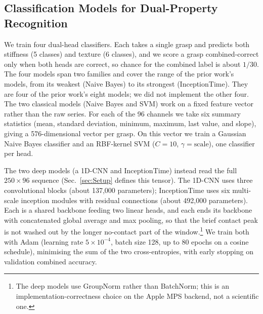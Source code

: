 \documentclass[journal]{IEEEtran}
\begin{document}
\subsection{Classification Models for Dual-Property Recognition}
\label{Methodology:Classification_Models}
%
%
%
We train four dual-head classifiers. Each takes a single grasp and predicts both stiffness (5 classes) and texture (6 classes), and we score a grasp combined-correct only when both heads are correct, so chance for the combined label is about $1/30$. The four models span two families and cover the range of the prior work's models, from its weakest (Naive Bayes) to its strongest (InceptionTime). They are four of the prior work's eight models; we did not implement the other four.
%
The two classical models (Naive Bayes and SVM) work on a fixed feature vector rather than the raw series. For each of the 96 channels we take six summary statistics (mean, standard deviation, minimum, maximum, last value, and slope), giving a 576-dimensional vector per grasp. On this vector we train a Gaussian Naive Bayes classifier and an RBF-kernel SVM ($C=10$, $\gamma=\mathrm{scale}$), one classifier per head.
%
%
%
%
%
% 
%
%

The two deep models (a 1D-CNN and InceptionTime) instead read the full $250 \times 96$ sequence (Sec.~\ref{sec:Setup} defines this tensor). The 1D-CNN uses three convolutional blocks (about 137{,}000 parameters); InceptionTime uses six multi-scale inception modules with residual connections (about 492{,}000 parameters). Each is a shared backbone feeding two linear heads, and each ends its backbone with concatenated global average and max pooling, so that the brief contact peak is not washed out by the longer no-contact part of the window.\footnote{The deep models use GroupNorm rather than BatchNorm; this is an implementation-correctness choice on the Apple MPS backend, not a scientific one.} We train both with Adam (learning rate $5\times10^{-4}$, batch size 128, up to 80 epochs on a cosine schedule), minimising the sum of the two cross-entropies, with early stopping on validation combined accuracy.
\end{document}
